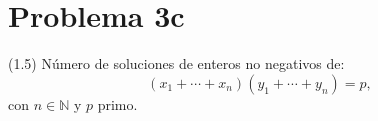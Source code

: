 
\section*{Problema 3c}
(1.5) Número de soluciones de enteros no negativos de:
\[
  (x_1+\cdots+x_n)(y_1+\cdots+y_n) = p,
\]
con $n\in\mathbb{N}$ y $p$ primo.

